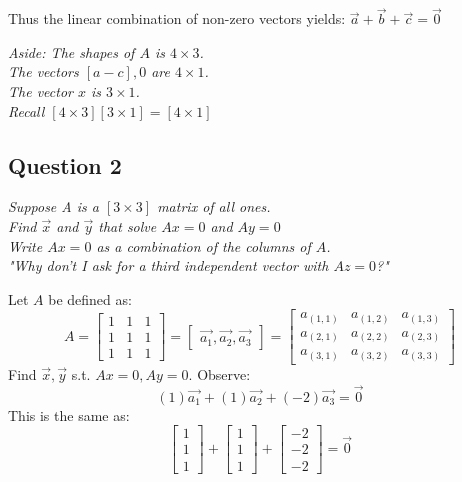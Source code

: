 \documentclass[11pt]{article}
\theoremstyle{plain}
\begin{document}
Thus the linear combination of non-zero vectors yields: $\vec{a} + \vec{b} + \vec{c} = \vec{0}$
\begin{center}
	\textit{Aside: The shapes of $A$ is $4 \times 3$. \\ The vectors $[a-c],0$ are $4 \times 1$. \\ The vector $x$ is $3 \times 1$. \\ Recall $[4 \times 3][3 \times 1] = [4 \times 1]$ }
\end{center}
\begin{center}
	\section*{Question 2}
\end{center}
\begin{center}
	\textit{Suppose A is a $[3 \times 3]$ matrix of all ones. \\
		Find $\vec{x}$ and $\vec{y}$ that solve $Ax=0$ and $Ay=0$ \\
		Write $Ax=0$ as a combination of the columns of $A$. \\
		"Why don't I ask for a third independent vector with $Az=0$?"}
\end{center}
Let $A$ be defined as:
\[
	A = \begin{bmatrix}
		1 & 1 & 1 \\
		1 & 1 & 1 \\
		1 & 1 & 1
	\end{bmatrix}
	= \begin{bmatrix}
		\vec{a_1}, \vec{a_2}, \vec{a_3}
	\end{bmatrix}
	= \begin{bmatrix}
		a_{(1,1)} & a_{(1,2)} & a_{(1,3)} \\
		a_{(2,1)} & a_{(2,2)} & a_{(2,3)} \\
		a_{(3,1)} & a_{(3,2)} & a_{(3,3)}
	\end{bmatrix}
\]
Find $\vec{x}, \vec{y}$ s.t. $Ax=0, Ay=0$. Observe:
\[
	(1)\vec{a_1} + (1)\vec{a_2} + (-2)\vec{a_3} = \vec{0}
\]
This is the same as:
\[
	\begin{bmatrix} 1 \\ 1 \\ 1 \end{bmatrix}
	+ \begin{bmatrix} 1 \\ 1 \\ 1 \end{bmatrix}
	+ \begin{bmatrix} -2 \\ -2 \\ -2 \end{bmatrix}
	= \vec{0}
\]
\end{document}
